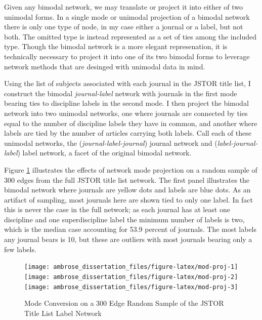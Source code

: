 \documentclass[]{book}
\begin{document}
Given any bimodal network, we may translate or project it into either of
two unimodal forms. In a single mode or unimodal projection of a bimodal
network there is only one type of node, in my case either a journal or a
label, but not both. The omitted type is instead represented as a set of
ties among the included type. Though the bimodal network is a more
elegant represenation, it is technically necessary to project it into
one of its two bimodal forms to leverage network methods that are
desinged with unimodal data in mind.

Using the list of subjects associated with each journal in the JSTOR
title list, I construct the bimodal \emph{journal-label} network with
journals in the first mode bearing ties to discipline labels in the
second mode. I then project the bimodal network into two unimodal
networks, one where journals are connected by ties equal to the number
of discipline labels they have in common, and another where labels are
tied by the number of articles carrying both labels. Call each of these
unimodal networks, the (\emph{journal-label-journal}) journal network
and (\emph{label-journal-label}) label network, a facet of the original
bimodal network.

Figure \ref{fig:mod-proj} illustrates the effects of network mode
projection on a random sample of 300 edges from the full JSTOR title
list network. The first panel illustrates the bimodal network where
journals are yellow dots and labels are blue dots. As an artifact of
sampling, most journals here are shown tied to only one label. In fact
this is never the case in the full network; as each journal has at least
one discipline and one superdiscipline label the minimum number of
labels is two, which is the median case accounting for 53.9 percent of
journals. The most labels any journal bears is 10, but these are
outliers with most journals bearing only a few labels.

\begin{figure}

{\centering \texttt{[image: ambrose\_dissertation\_files/figure-latex/mod-proj-1]} \texttt{[image: ambrose\_dissertation\_files/figure-latex/mod-proj-2]} \texttt{[image: ambrose\_dissertation\_files/figure-latex/mod-proj-3]} 

}

\caption{Mode Conversion on a 300 Edge Random Sample of the JSTOR Title List Label Network}\label{fig:mod-proj}
\end{figure}
\end{document}
